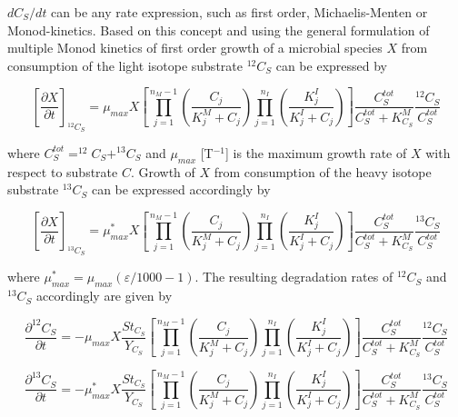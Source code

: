 $dC_S/dt$ can be any rate expression, such as first order, Michaelis-Menten or Monod-kinetics. Based on this concept and using the general formulation of multiple Monod kinetics of first order growth of a microbial species $X$ from consumption of the light isotope substrate $^{12}C_S$ can be expressed by

\begin{equation}
    \left[
    \frac{\partial X}{\partial t}
    \right]_{^{12}C_S}
    = \mu_{max} X\left[
    \prod_{j=1}^{n_M-1} \left( \frac{C_j}{K_{j}^M + C_j} \right)
    \prod_{j=1}^{n_I} \left( \frac{K_{j}^I}{K_{j}^I + C_j} \right)
    \right]
    \frac{C_S^{tot}}{C_S^{tot} + K_{C_S}^M}
    \frac{^{12}C_S}{C_S^{tot}}
    \label{iso_monod_light}
\end{equation}

where $C_S^{tot} = ^{12}C_S+^{13}C_S$ and $\mu_{max}$ [T$^{-1}$] is the maximum growth rate of $X$ with respect to substrate $C$. Growth of $X$ from consumption of the heavy isotope substrate $^{13}C_S$ can be expressed accordingly by


\begin{equation}
        \left[
    \frac{\partial X}{\partial t}
    \right]_{^{13}C_S}
    = \mu_{max}^{\ast} X\left[
    \prod_{j=1}^{n_M-1} \left( \frac{C_j}{K_{j}^M + C_j} \right)
    \prod_{j=1}^{n_I} \left( \frac{K_{j}^I}{K_{j}^I + C_j} \right)
    \right]
    \frac{C_S^{tot}}{C_S^{tot} + K_{C_S}^M}
    \frac{^{13}C_S}{C_S^{tot}}
    \label{iso_monod_heavy}
\end{equation}

where $\mu_{max}^{\ast}= \mu_{max}(\varepsilon/1000 -1)$. The resulting degradation rates of $^{12}C_S$ and $^{13}C_S$ accordingly are given by

\begin{equation}
    \frac{\partial ^{12}C_S}{\partial t} = -\mu_{max} X\frac{St_{C_S}}{Y_{C_S}}
    \left[
    \prod_{j=1}^{n_M-1} \left( \frac{C_j}{K_{j}^M + C_j} \right)
    \prod_{j=1}^{n_I} \left( \frac{K_{j}^I}{K_{j}^I + C_j} \right)
    \right]
    \frac{C_S^{tot}}{C_S^{tot} + K_{C_S}^M}
    \frac{^{12}C_S}{C_S^{tot}}
    \label{iso_monod_sub_light}
\end{equation}

\begin{equation}
    \frac{\partial ^{13}C_S}{\partial t} = -\mu_{max}^{\ast} X\frac{St_{C_S}}{Y_{C_S}}
    \left[
    \prod_{j=1}^{n_M-1} \left( \frac{C_j}{K_{j}^M + C_j} \right)
    \prod_{j=1}^{n_I} \left( \frac{K_{j}^I}{K_{j}^I + C_j} \right)
    \right]
    \frac{C_S^{tot}}{C_S^{tot} + K_{C_S}^M}
    \frac{^{13}C_S}{C_S^{tot}}
    \label{iso_monod_sub_heavy}
\end{equation}


